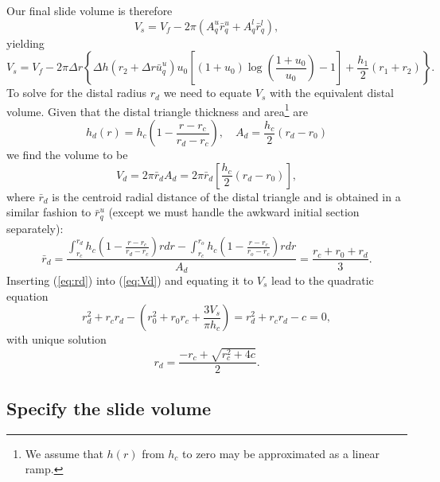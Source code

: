 \documentclass[12pt,letterpaper,margin=0.5in]{report}
\begin{document}
Our final slide volume is therefore
\begin{equation}
V_s = V_f - 2 \pi \left (A^u_q \bar{r}^u_q + A^l_q \bar{r}^l_q \right ),
\end{equation}
yielding
\begin{equation}
V_s = V_f - 2 \pi \Delta r \left \{ \Delta h \left ( r_2 + \Delta r\bar{u}_q^u \right ) u_0 \left [ (1 + u_0) \log \left (\frac{1 + u_0}{u_0} \right ) - 1 \right ] + \frac{h_1}{2} (r_1 + r_2) \right \}.
\label{eq:Vs}
\end{equation}
To solve for the distal radius $r_d$ we need to equate $V_s$ with the equivalent distal volume.
Given that the distal triangle thickness and area\footnote{We assume that $h(r)$ from $h_c$ to zero may be approximated as a linear ramp.} are
\begin{equation}
h_d(r) = h_c \left (1 - \frac{r - r_c}{r_d - r_c}\right ), \quad A_d = \frac{h_c}{2} (r_d - r_0)
\end{equation}
we find the volume to be
\begin{equation}
V_d = 2 \pi \bar{r}_d A_d = 2 \pi \bar{r}_d \left [ \frac{h_c}{2} (r_d - r_0) \right ],
\label{eq:Vd}
\end{equation}
where $\bar{r}_d$ is the centroid radial distance of the distal triangle and is obtained in a similar fashion to $\bar{r}_q^u$ (except
we must handle the awkward initial section separately):
\begin{equation}
\bar{r}_d = \frac{\int_{r_c}^{r_d}h_c \left (1 - \frac{r - r_c}{r_d - r_c} \right )rdr - \int_{r_c}^{r_o}h_c \left (1 - \frac{r - r_c}{r_o- r_c} \right )rdr}{A_d} = \frac{r_c + r_0 + r_d}{3}.
\label{eq:rd}
\end{equation}
Inserting (\ref{eq:rd}) into (\ref{eq:Vd}) and equating it to $V_s$ lead to the quadratic equation
\begin{equation}
r_d^2 + r_c r_d - \left (r_0^2 + r_0 r_c + \frac{3 V_s}{\pi h_c}\right ) = r_d^2 + r_c r_d - c = 0,
\end{equation}
with unique solution
\begin{equation}
r_d = \frac{-r_c + \sqrt{r_c^2 + 4c}}{2}.
\end{equation}

\subsection{Specify the slide volume}
\end{document}
